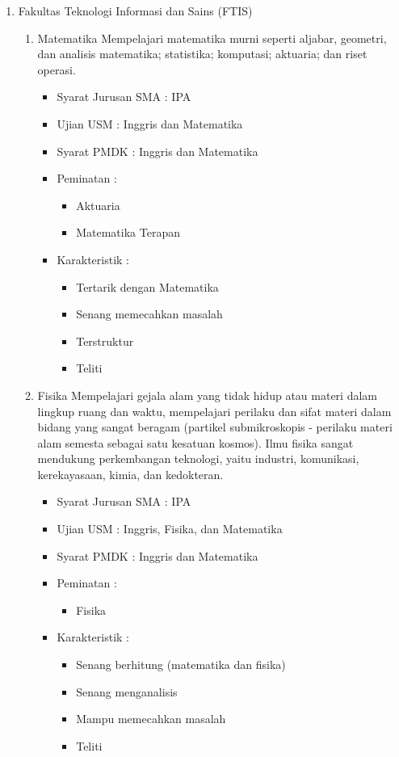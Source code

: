 \documentclass[a4paper,twoside]{article}
\begin{document}
\begin{enumerate}
\begin{enumerate}
			\item Fakultas Teknologi Informasi dan Sains (FTIS)
			\begin{enumerate}
				\item Matematika
					Mempelajari matematika murni seperti aljabar, geometri, dan analisis matematika; statistika; komputasi; aktuaria; dan riset operasi.
					\begin{itemize}
						\item Syarat Jurusan SMA : IPA
						\item Ujian USM : Inggris dan Matematika
						\item Syarat PMDK : Inggris dan Matematika
						\item Peminatan :
						\begin{itemize}
							\item Aktuaria
							\item Matematika Terapan
						\end{itemize}
						\item Karakteristik :
						\begin{itemize}
							\item Tertarik dengan Matematika
							\item Senang memecahkan masalah
							\item Terstruktur
							\item Teliti
						\end{itemize}
					\end{itemize}
					
				\item Fisika
					Mempelajari gejala alam yang tidak hidup atau materi dalam lingkup ruang dan waktu, mempelajari perilaku dan sifat materi dalam bidang yang sangat beragam (partikel submikroskopis - perilaku materi alam semesta sebagai satu kesatuan kosmos). Ilmu fisika sangat mendukung perkembangan teknologi, yaitu industri, komunikasi, kerekayasaan, kimia, dan kedokteran.
					\begin{itemize}
						\item Syarat Jurusan SMA : IPA
						\item Ujian USM : Inggris, Fisika, dan Matematika
						\item Syarat PMDK : Inggris dan Matematika
						\item Peminatan :
						\begin{itemize}
							\item Fisika
						\end{itemize}
						\item Karakteristik :
						\begin{itemize}
							\item Senang berhitung (matematika dan fisika)
							\item Senang menganalisis
							\item Mampu memecahkan masalah
							\item Teliti
						\end{itemize}
					\end{itemize}
					

\end{enumerate}
\end{enumerate}
\end{enumerate}
\end{document}
